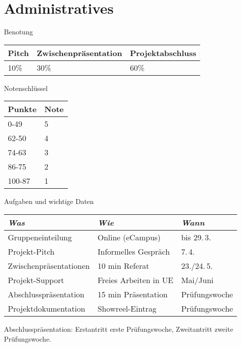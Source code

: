 
\section{Administratives}
 \frame{\sectionpage}

\begin{frame}{Benotung}

 
\begin{table}[]
\begin{tabular}{l|l|l}
Pitch & Zwischenpräsentation & Projektabschluss \\ \hline
10\%  & 30\%                & 60\%       
\end{tabular}
\end{table}



\end{frame}


\begin{frame}{Notenschlüssel}


 
\begin{table}[]
\begin{tabular}{l|l}
Punkte & Note \\ \hline
0-49   & 5    \\
62-50  & 4    \\
74-63  & 3    \\
86-75  & 2    \\
100-87 & 1   
\end{tabular}
\end{table}

\end{frame}


\begin{frame}{Aufgaben und wichtige Daten}
\begin{table}[]
\begin{tabular}{l|l|l}
\emph{Was}             &  \emph{Wie}           & \emph{Wann}	\\ \hline
Gruppeneinteilung      & Online (eCampus)      & bis 29.\,3. \\  
Projekt-Pitch          & Informelles Gespräch  & 7.\,4.	\\
Zwischenpräsentationen & 10 min Referat        & 23./24.\,5.	\\
Projekt-Support        & Freies Arbeiten in UE & Mai/Juni	\\
Abschlusspräsentation  & 15 min Präsentation   & Prüfungswoche \\
Projektdokumentation   & Showreel-Eintrag      & Prüfungswoche
\end{tabular}
\end{table}

Abschlusspräsentation: Erstantritt erste Prüfungswoche, Zweitantritt zweite Prüfungswoche.

\end{frame}



